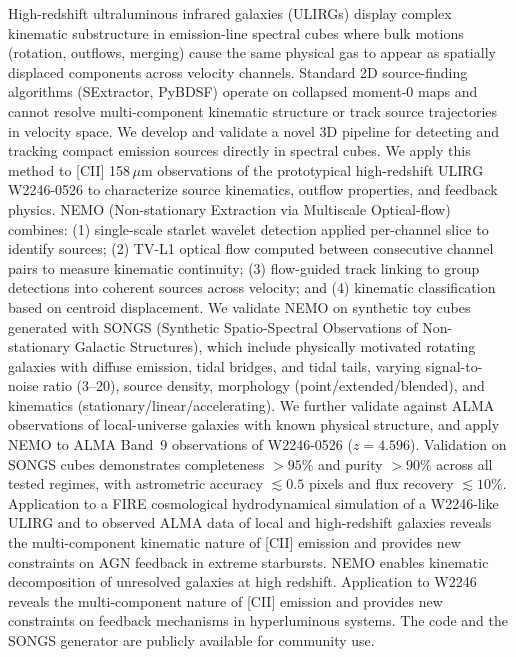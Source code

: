 \documentclass{aa}
\begin{document}
\abstract
{High-redshift ultraluminous infrared galaxies (ULIRGs) display complex kinematic substructure in emission-line spectral cubes where bulk motions (rotation, outflows, merging) cause the same physical gas to appear as spatially displaced components across velocity channels. Standard 2D source-finding algorithms (SExtractor, PyBDSF) operate on collapsed moment-0 maps and cannot resolve multi-component kinematic structure or track source trajectories in velocity space.}
{We develop and validate a novel 3D pipeline for detecting and tracking compact emission sources directly in spectral cubes. We apply this method to [CII] 158\,$\mu$m observations of the prototypical high-redshift ULIRG W2246-0526 to characterize source kinematics, outflow properties, and feedback physics.}
{NEMO (Non-stationary Extraction via Multiscale Optical-flow) combines: (1) single-scale starlet wavelet detection applied per-channel slice to identify sources; (2) TV-L1 optical flow computed between consecutive channel pairs to measure kinematic continuity; (3) flow-guided track linking to group detections into coherent sources across velocity; and (4) kinematic classification based on centroid displacement. We validate NEMO on synthetic toy cubes generated with SONGS (Synthetic Spatio-Spectral Observations of Non-stationary Galactic Structures), which include physically motivated rotating galaxies with diffuse emission, tidal bridges, and tidal tails, varying signal-to-noise ratio (3--20), source density, morphology (point/extended/blended), and kinematics (stationary/linear/accelerating). We further validate against ALMA observations of local-universe galaxies with known physical structure, and apply NEMO to ALMA Band~9 observations of W2246-0526 ($z=4.596$).}
{Validation on SONGS cubes demonstrates completeness $>95\%$ and purity $>90\%$ across all tested regimes, with astrometric accuracy $\lesssim0.5$ pixels and flux recovery $\lesssim10\%$. Application to a FIRE cosmological hydrodynamical simulation of a W2246-like ULIRG and to observed ALMA data of local and high-redshift galaxies reveals the multi-component kinematic nature of [CII] emission and provides new constraints on AGN feedback in extreme starbursts.}
{NEMO enables kinematic decomposition of unresolved galaxies at high redshift. Application to W2246 reveals the multi-component nature of [CII] emission and provides new constraints on feedback mechanisms in hyperluminous systems. The code and the SONGS generator are publicly available for community use.}
\end{document}
